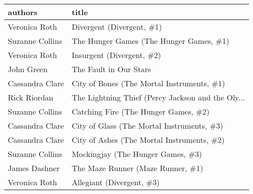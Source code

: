 \begin{tabular}{ll}
\toprule
         authors &                                              title \\
\midrule
   Veronica Roth &                          Divergent (Divergent, \#1) \\
 Suzanne Collins &            The Hunger Games (The Hunger Games, \#1) \\
   Veronica Roth &                          Insurgent (Divergent, \#2) \\
      John Green &                             The Fault in Our Stars \\
 Cassandra Clare &         City of Bones (The Mortal Instruments, \#1) \\
    Rick Riordan &  The Lightning Thief (Percy Jackson and the Oly... \\
 Suzanne Collins &               Catching Fire (The Hunger Games, \#2) \\
 Cassandra Clare &         City of Glass (The Mortal Instruments, \#3) \\
 Cassandra Clare &         City of Ashes (The Mortal Instruments, \#2) \\
 Suzanne Collins &                  Mockingjay (The Hunger Games, \#3) \\
   James Dashner &                  The Maze Runner (Maze Runner, \#1) \\
   Veronica Roth &                          Allegiant (Divergent, \#3) \\
\bottomrule
\end{tabular}
